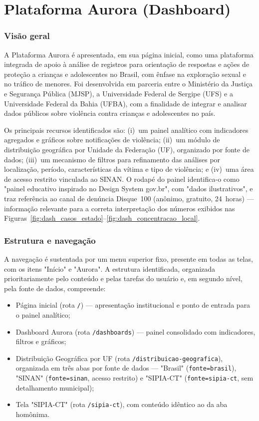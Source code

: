 \documentclass[11pt,a4paper]{article}
\begin{document}
\clearpage
\section{Plataforma Aurora (Dashboard)}
\label{ap:aurora}

\subsubsection{Visão geral}

A Plataforma Aurora é apresentada, em sua página inicial, como uma plataforma integrada de apoio à análise de registros para orientação de respostas e ações de proteção a crianças e adolescentes no Brasil, com ênfase na exploração sexual e no tráfico de menores. Foi desenvolvida em parceria entre o Ministério da Justiça e Segurança Pública (MJSP), a Universidade Federal de Sergipe (UFS) e a Universidade Federal da Bahia (UFBA), com a finalidade de integrar e analisar dados públicos sobre violência contra crianças e adolescentes no país.

Os principais recursos identificados são: (i)~um painel analítico com indicadores agregados e gráficos sobre notificações de violência; (ii)~um módulo de distribuição geográfica por Unidade da Federação (UF), organizado por fonte de dados; (iii)~um mecanismo de filtros para refinamento das análises por localização, período, características da vítima e tipo de violência; e (iv)~uma área de acesso restrito vinculada ao SINAN. O rodapé do painel identifica-o como "painel educativo inspirado no Design System gov.br", com "dados ilustrativos", e traz referência ao canal de denúncia Disque~100 (anônimo, gratuito, 24~horas) — informação relevante para a correta interpretação dos números exibidos nas Figuras~\ref{fig:dash_casos_estado}--\ref{fig:dash_concentracao_local}.

\subsubsection{Estrutura e navegação}

A navegação é sustentada por um menu superior fixo, presente em todas as telas, com os itens "Início" e "Aurora". A estrutura identificada, organizada prioritariamente pelo conteúdo e pelas tarefas do usuário e, em segundo nível, pela fonte de dados, compreende:

\begin{itemize}
  \item Página inicial (rota \texttt{/}) — apresentação institucional e ponto de entrada para o painel analítico;
  \item Dashboard Aurora (rota \texttt{/dashboards}) — painel consolidado com indicadores, filtros e gráficos;
  \item Distribuição Geográfica por UF (rota \texttt{/distribuicao-geografica}), organizada em três abas por fonte de dados — "Brasil" (\texttt{fonte=brasil}), "SINAN" (\texttt{fonte=sinan}, acesso restrito) e "SIPIA-CT" (\texttt{fonte=sipia-ct}, sem detalhamento municipal);
  \item Tela "SIPIA-CT" (rota \texttt{/sipia-ct}), com conteúdo idêntico ao da aba homônima.
\end{itemize}
\end{document}
